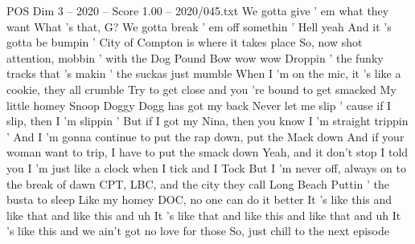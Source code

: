 \begin{textsample}{POS Dim 3 – 2020 – Score 1.00 – 2020/045.txt}
We gotta give ' em what they want What 's that, G?
We gotta break ' em off somethin ' Hell yeah And it 's gotta be bumpin ' City of Compton is where it takes place So, now shot attention, mobbin ' with the Dog Pound Bow wow wow Droppin ' the funky tracks that 's makin ' the suckas just mumble When I 'm on the mic, it 's like a cookie, they all crumble Try to get close and you 're bound to get smacked My little homey Snoop Doggy Dogg has got my back Never let me slip ' cause if I slip, then I 'm slippin ' But if I got my Nina, then you know I 'm straight trippin ' And I 'm gonna continue to put the rap down, put the Mack down And if your woman want to trip, I have to put the smack down Yeah, and it don't stop I told you I 'm just like a clock when I tick and I Tock But I 'm never off, always on to the break of dawn CPT, LBC, and the city they call Long Beach Puttin ' the busta to sleep Like my homey DOC, no one can do it better It 's like this and like that and like this and uh It 's like that and like this and like that and uh It 's like this and we ain't got no love for those So, just chill to the next episode

\end{textsample}
